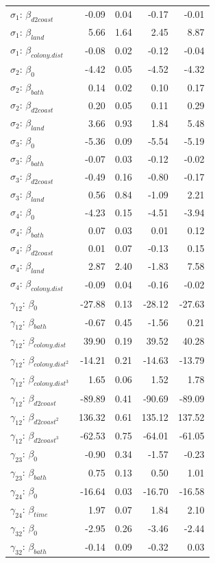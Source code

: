 \documentclass{rgclass}
\begin{document}
\begin{longtable}{@{}lrrrr@{}}
$\sigma_{1}$: $\beta_{d2coast}$ & -0.09 & 0.04 & -0.17 & -0.01 \\
$\sigma_{1}$: $\beta_{land}$ & 5.66 & 1.64 & 2.45 & 8.87 \\
$\sigma_{1}$: $\beta_{colony.dist}$ & -0.08 & 0.02 & -0.12 & -0.04 \\
\hdashline
$\sigma_{2}$: $\beta_0$ & -4.42 & 0.05 & -4.52 & -4.32 \\
$\sigma_{2}$: $\beta_{bath}$ & 0.14 & 0.02 & 0.10 & 0.17 \\
$\sigma_{2}$: $\beta_{d2coast}$ & 0.20 & 0.05 & 0.11 & 0.29 \\
$\sigma_{2}$: $\beta_{land}$ & 3.66 & 0.93 & 1.84 & 5.48 \\
\hdashline
$\sigma_{3}$: $\beta_0$ & -5.36 & 0.09 & -5.54 & -5.19 \\
$\sigma_{3}$: $\beta_{bath}$ & -0.07 & 0.03 & -0.12 & -0.02 \\
$\sigma_{3}$: $\beta_{d2coast}$ & -0.49 & 0.16 & -0.80 & -0.17 \\
$\sigma_{3}$: $\beta_{land}$ & 0.56 & 0.84 & -1.09 & 2.21 \\
\hdashline
$\sigma_{4}$: $\beta_0$ & -4.23 & 0.15 & -4.51 & -3.94 \\
$\sigma_{4}$: $\beta_{bath}$ & 0.07 & 0.03 & 0.01 & 0.12 \\
$\sigma_{4}$: $\beta_{d2coast}$ & 0.01 & 0.07 & -0.13 & 0.15 \\
$\sigma_{4}$: $\beta_{land}$ & 2.87 & 2.40 & -1.83 & 7.58 \\
$\sigma_{4}$: $\beta_{colony.dist}$ & -0.09 & 0.04 & -0.16 & -0.02 \\
\hdashline
$\gamma_{12}$: $\beta_0$ & -27.88 & 0.13 & -28.12 & -27.63 \\
$\gamma_{12}$: $\beta_{bath}$ & -0.67 & 0.45 & -1.56 & 0.21 \\
$\gamma_{12}$: $\beta_{colony.dist}$ & 39.90 & 0.19 & 39.52 & 40.28 \\
$\gamma_{12}$: $\beta_{colony.dist^2}$ & -14.21 & 0.21 & -14.63 & -13.79 \\
$\gamma_{12}$: $\beta_{colony.dist^3}$ & 1.65 & 0.06 & 1.52 & 1.78 \\
$\gamma_{12}$: $\beta_{d2coast}$ & -89.89 & 0.41 & -90.69 & -89.09 \\
$\gamma_{12}$: $\beta_{d2coast^2}$ & 136.32 & 0.61 & 135.12 & 137.52 \\
$\gamma_{12}$: $\beta_{d2coast^3}$ & -62.53 & 0.75 & -64.01 & -61.05 \\
\hdashline
$\gamma_{23}$: $\beta_0$ & -0.90 & 0.34 & -1.57 & -0.23 \\
$\gamma_{23}$: $\beta_{bath}$ & 0.75 & 0.13 & 0.50 & 1.01 \\
\hdashline
$\gamma_{24}$: $\beta_0$ & -16.64 & 0.03 & -16.70 & -16.58 \\
$\gamma_{24}$: $\beta_{time}$ & 1.97 & 0.07 & 1.84 & 2.10 \\
\hdashline
$\gamma_{32}$: $\beta_0$ & -2.95 & 0.26 & -3.46 & -2.44 \\
$\gamma_{32}$: $\beta_{bath}$ & -0.14 & 0.09 & -0.32 & 0.03 \\
\bottomrule
\end{longtable}
\end{document}

